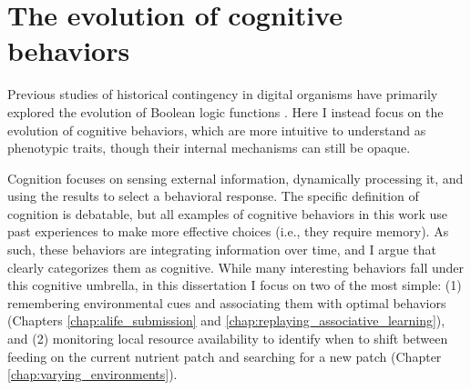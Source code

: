 \section{The evolution of cognitive behaviors}

Previous studies of historical contingency in digital organisms have primarily explored the evolution of Boolean logic functions \citep{wagenaarInfluenceChanceHistory2004, bundyHowFootprintHistory2021}.
Here I instead focus on the evolution of cognitive behaviors, which are more intuitive to understand as phenotypic traits, though their internal mechanisms can still be opaque.

Cognition focuses on sensing external information, dynamically processing it, and using the results to select a behavioral response.
The specific definition of cognition is debatable, but all examples of cognitive behaviors in this work use past experiences to make more effective choices (i.e., they require memory).
As such, these behaviors are integrating information over time, and I argue that clearly categorizes them as cognitive. 
While many interesting behaviors fall under this cognitive umbrella, in this dissertation I focus on two of the most simple: (1) remembering environmental cues and associating them with optimal behaviors (Chapters \ref{chap:alife_submission} and \ref{chap:replaying_associative_learning}), and (2) monitoring local resource availability to identify when to shift between feeding on the current nutrient patch and searching for a new patch (Chapter \ref{chap:varying_environments}). 

